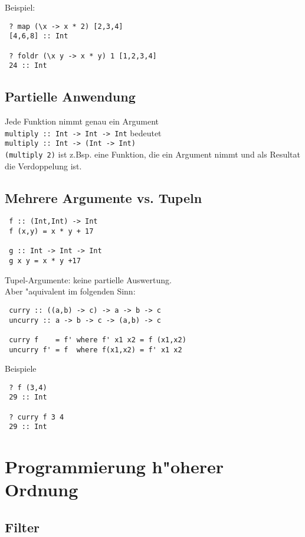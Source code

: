 \documentclass[german,10pt, a4paper, twocolumn]{scrartcl}
\theoremstyle{definition}
\theoremstyle{remark}
\begin{document}
Beispiel:
\begin{verbatim}
 ? map (\x -> x * 2) [2,3,4]
 [4,6,8] :: Int

 ? foldr (\x y -> x * y) 1 [1,2,3,4]
 24 :: Int
\end{verbatim}

\subsection{Partielle Anwendung}

Jede Funktion nimmt genau ein Argument\\
\verb#multiply :: Int -> Int -> Int# bedeutet\\
\verb#multiply :: Int -> (Int -> Int)#\\

\verb#(multiply 2)# ist z.Bsp. eine Funktion, die ein Argument nimmt und als Resultat die Verdoppelung ist.

\subsection{Mehrere Argumente vs. Tupeln}

\begin{verbatim}
 f :: (Int,Int) -> Int
 f (x,y) = x * y + 17

 g :: Int -> Int -> Int
 g x y = x * y +17
\end{verbatim}

Tupel-Argumente: keine partielle Auswertung.\\

Aber "aquivalent im folgenden Sinn:
\begin{verbatim}
 curry :: ((a,b) -> c) -> a -> b -> c
 uncurry :: a -> b -> c -> (a,b) -> c

 curry f    = f' where f' x1 x2 = f (x1,x2)
 uncurry f' = f  where f(x1,x2) = f' x1 x2
\end{verbatim}

Beispiele
\begin{verbatim}
 ? f (3,4)
 29 :: Int

 ? curry f 3 4
 29 :: Int
\end{verbatim}

\section{Programmierung h"oherer Ordnung}

\subsection{Filter}
\end{document}
